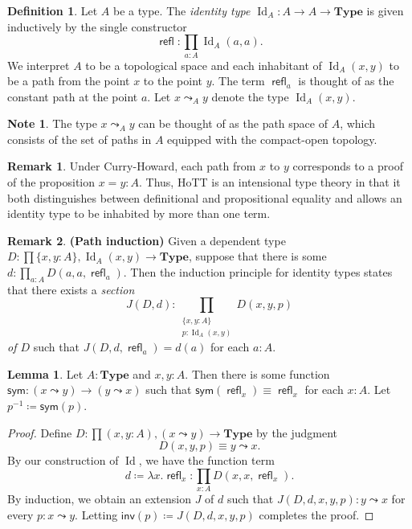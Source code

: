 \documentclass[10pt,letterpaper,cm]{nupset}
\theoremstyle{definition}
\newtheorem*{definition}{Definition}
\newtheorem{note}{Note}
\newtheorem{remark}{Remark}
\newtheorem{lemma}{Lemma}
\newcommand{\1}{\mathbf{1}}
\newcommand{\0}{\vec 0}
\DeclareMathOperator{\id}{Id}
\DeclareMathOperator{\refl}{\mathsf{refl}}
\begin{document}
\begin{definition}
Let $A$ be a type. The \textit{identity type $\id_A : A \to A \to \mathbf{Type}$} is given inductively  by the single constructor $$\refl : \prod_{a: A} \id_A(a,a).$$ We interpret $A$ to be a topological space and each inhabitant of $\id_A(x,y)$ to be a path from the point $x$ to the point $y$. The term $\refl_a$ is thought of as the constant path at the point $a$. Let $x \leadsto_A y$ denote the type $\id_A(x,y)$.
\end{definition}

\begin{note}
The type $x \leadsto_A y$ can be thought of as the path space of $A$, which consists of the set of paths in $A$ equipped with the compact-open topology. 
\end{note}

\begin{remark} 
Under Curry-Howard, each path from $x$ to $y$ corresponds to a proof of the proposition  $x=y : A$.  Thus, HoTT is an intensional type theory in that it both distinguishes between definitional and propositional equality and allows an identity type to be inhabited by more than one term.
\end{remark}

\begin{remark}{\textbf{(Path induction)}}
Given a dependent type $D: \prod {\{x,y:A\}}, \id_A(x,y) \to \mathbf{Type}$, suppose that there is some $d: \prod_{a:A} D(a,a, \refl_a)$. Then the induction principle for identity types states that there exists a \textit{section}  $$J(D, d)  :  \prod_{\substack{\{x,y:A\} \\ p: \id_A(x,y)}} D(x,y,p) $$  \textit{of $D$} such that $J(D, d, \refl_a) = d(a)$ for each $a: A$.
\end{remark}

\begin{lemma}
Let $A: \mathbf{Type}$ and $x,y: A$. Then there is some function $\mathsf{sym}:(x\leadsto y) \to (y \leadsto x)$ such that $\mathsf{sym} (\refl_x) \equiv \refl_x$ for each $x:A$. Let $p^{-1} \coloneqq \mathsf{sym}(p)$.
\end{lemma}
\begin{proof}
Define $D: \prod (x,y:A), (x\leadsto y) \to \mathbf{Type}$ by the judgment $$D(x,y,p) \equiv y \leadsto x .$$ By our construction of $\id$, we have the function term $$d\coloneqq \lambda x. \refl_x : \prod_{x:A}D(x,x,\refl_x).$$ By induction, we obtain an extension $J$ of $d$ such that $J(D, d, x, y, p) : y \leadsto x$ for every $p: x \leadsto y$. Letting $\mathsf{inv}(p) \coloneqq J(D, d,x,y,p)$ completes the proof.
\end{proof}
\end{document}
